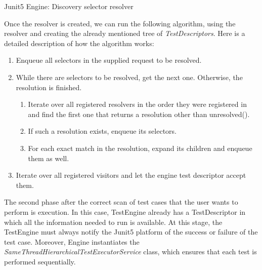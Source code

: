\begin{algorithm}[H]
    \label{02:alg:selectorresolver}
    \caption{Junit5 Engine: Discovery selector resolver}
    \begin{algorithmic}[1]
		\EndProcedure
    \end{algorithmic}
\end{algorithm}

Once the resolver is created, we can run the following algorithm, using the resolver and creating the already mentioned tree of \emph{TestDescriptors}. Here is a detailed description of how the algorithm works:

\begin{enumerate}[itemsep=1mm, parsep=0pt]
    \item Enqueue all selectors in the supplied request to be resolved.
    \item While there are selectors to be resolved, get the next one. Otherwise, the resolution is finished.
    \begin{enumerate}
        \item Iterate over all registered resolvers in the order they were registered in and find the first one that returns a resolution other than unresolved().
        \item If such a resolution exists, enqueue its selectors.
        \item For each exact match in the resolution, expand its children and enqueue them as well.
    \end{enumerate}
    \item Iterate over all registered visitors and let the engine test descriptor accept them.
\end{enumerate}

The second phase after the correct scan of test cases that the user wants to perform is execution. In this case, TestEngine already has a TestDescriptor in which all the information needed to run is available. At this stage, the TestEngine must always notify the Junit5 platform of the success or failure of the test case. Moreover, Engine instantiates the \emph{SameThreadHierarchicalTestExecutorService} class, which ensures that each test is performed sequentially.

